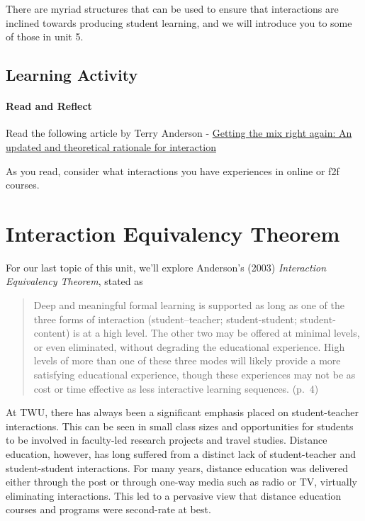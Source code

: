 \documentclass[
]{book}
\begin{document}
There are myriad structures that can be used to ensure that interactions are inclined towards producing student learning, and we will introduce you to some of those in unit 5.

\hypertarget{learning-activity-2}{%
\subsection*{Learning Activity}\label{learning-activity-2}}

\begin{reflect}
\hypertarget{read-and-reflect}{%
\paragraph{Read and Reflect}\label{read-and-reflect}}

Read the following article by Terry Anderson -
\href{http://www.irrodl.org/index.php/irrodl/article/view/149/230}{Getting
the mix right again: An updated and theoretical rationale for
interaction}

As you read, consider what interactions you have experiences in online
or f2f courses.
\end{reflect}

\hypertarget{interaction-equivalency-theorem}{%
\section{Interaction Equivalency Theorem}\label{interaction-equivalency-theorem}}

For our last topic of this unit, we'll explore Anderson's (2003) \emph{Interaction Equivalency Theorem}, stated as

\begin{quote}
Deep and meaningful formal learning is supported as long as one of the three forms of interaction (student--teacher; student-student; student-content) is at a high level. The other two may be offered at minimal levels, or even eliminated, without degrading the educational experience.
High levels of more than one of these three modes will likely provide a more satisfying educational experience, though these experiences may not be as cost or time effective as less interactive learning sequences. (p.~4)
\end{quote}

At TWU, there has always been a significant emphasis placed on student-teacher interactions. This can be seen in small class sizes and opportunities for students to be involved in faculty-led research projects and travel studies. Distance education, however, has long suffered from a distinct lack of student-teacher and student-student interactions. For many years, distance education was delivered either through the post or through one-way media such as radio or TV, virtually eliminating interactions. This led to a pervasive view that distance education courses and programs were second-rate at best.
\end{document}
